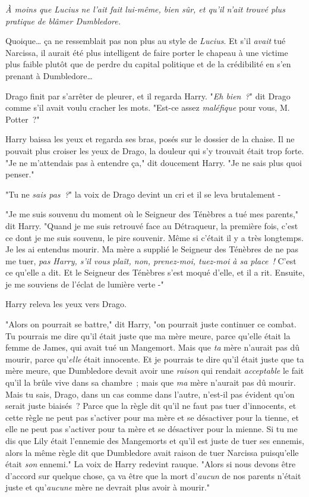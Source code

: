 \emph{À moins que Lucius ne l'ait fait lui-même, bien sûr, et qu'il n'ait trouvé plus pratique de blâmer Dumbledore.}

Quoique… ça ne ressemblait pas non plus au style de \emph{Lucius}. Et s'il \emph{avait} tué Narcissa, il aurait été plus intelligent de faire porter le chapeau à une victime plus faible plutôt que de perdre du capital politique et de la crédibilité en s'en prenant à Dumbledore…

Drago finit par s'arrêter de pleurer, et il regarda Harry. "\emph{Eh bien~?}" dit Drago comme s'il avait voulu cracher les mots. "Est-ce assez \emph{maléfique} pour vous, M. Potter~?"

Harry baissa les yeux et regarda ses bras, posés sur le dossier de la chaise. Il ne pouvait plus croiser les yeux de Drago, la douleur qui s'y trouvait était trop forte. "Je ne m'attendais pas à entendre ça," dit doucement Harry. "Je ne sais plus quoi penser."

"Tu ne \emph{sais pas~?}" la voix de Drago devint un cri et il se leva brutalement -

"Je me suis souvenu du moment où le Seigneur des Ténèbres a tué mes parents," dit Harry. "Quand je me suis retrouvé face au Détraqueur, la première fois, c'est ce dont je me suis souvenu, le pire souvenir. Même si c'était il y a très longtemps. Je les ai entendus mourir. Ma mère a supplié le Seigneur des Ténèbres de ne pas me tuer, \emph{pas Harry, s'il vous plaît, non, prenez-moi, tuez-moi à sa place~!} C'est ce qu'elle a dit. Et le Seigneur des Ténèbres s'est moqué d'elle, et il a rit. Ensuite, je me souviens de l'éclat de lumière verte -"

Harry releva les yeux vers Drago.

"Alors on pourrait se battre," dit Harry, "on pourrait juste continuer ce combat. Tu pourrais me dire qu'il était juste que ma mère meure, parce qu'elle était la femme de James, qui avait tué un Mangemort. Mais que \emph{ta} mère n'aurait pas dû mourir, parce qu'\emph{elle} était innocente. Et je pourrais te dire qu'il était juste que ta mère meure, que Dumbledore devait avoir une \emph{raison} qui rendait \emph{acceptable} le fait qu'il la brûle vive dans sa chambre~; mais que \emph{ma} mère n'aurait pas dû mourir. Mais tu sais, Drago, dans un cas comme dans l'autre, n'est-il pas évident qu'on serait juste biaisés~? Parce que la règle dit qu'il ne faut pas tuer d'innocents, et cette règle ne peut pas s'activer pour ma mère et se désactiver pour la tienne, et elle ne peut pas s'activer pour ta mère et se désactiver pour la mienne. Si tu me dis que Lily était l'ennemie des Mangemorts et qu'il est juste de tuer ses ennemis, alors la même règle dit que Dumbledore avait raison de tuer Narcissa puisqu'elle était \emph{son} ennemi." La voix de Harry redevint rauque. "Alors si nous devons être d'accord sur quelque chose, ça va être que la mort d'\emph{aucun} de nos parents n'était juste et qu'\emph{aucune} mère ne devrait plus avoir à mourir."

